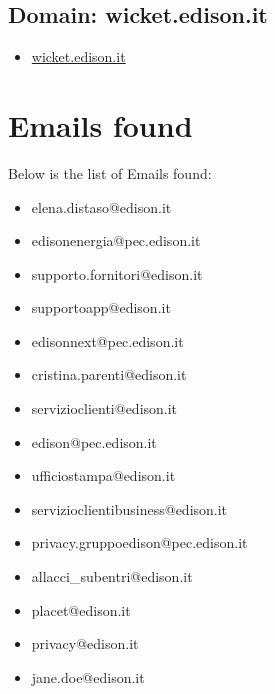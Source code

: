 \documentclass{article}
\begin{document}
    \subsection{Domain: wicket.edison.it}
    \begin{itemize}
        
            
                
                \item \href{ http://wicket.edison.it/}{ wicket.edison.it }
            
        
    \end{itemize}



\clearpage

\section{Emails found}

Below is the list of Emails found:

\begin{itemize}
    
        
            \item elena.distaso@edison.it
        
            \item edisonenergia@pec.edison.it
        
            \item supporto.fornitori@edison.it
        
            \item supportoapp@edison.it
        
            \item edisonnext@pec.edison.it
        
            \item cristina.parenti@edison.it
        
            \item servizioclienti@edison.it
        
            \item edison@pec.edison.it
        
            \item ufficiostampa@edison.it
        
            \item servizioclientibusiness@edison.it
        
            \item privacy.gruppoedison@pec.edison.it
        
            \item allacci\_subentri@edison.it
        
            \item placet@edison.it
        
            \item privacy@edison.it
        
            \item jane.doe@edison.it
        
    
\end{itemize}
\end{document}
